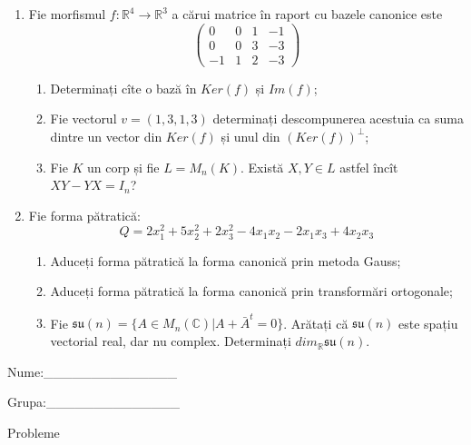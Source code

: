 \documentclass{article}
\begin{document}
\begin{enumerate}
 \item Fie morfismul $f:\mathbb{R}^4 \to \mathbb{R}^3$ a cărui matrice în raport cu bazele canonice este
$$\begin{pmatrix}
0&0&1&-1\\
0&0&3&-3\\
-1&1&2&-3
\end{pmatrix}$$

\begin{enumerate}
\item Determinați cîte o bază în $Ker(f)$ și $Im(f)$;
\item Fie vectorul $v=(1,3,1,3)$ determinați descompunerea acestuia ca suma dintre un vector din $Ker(f)$ și unul din $(Ker(f))^\perp$;
\item Fie $K$ un corp și fie $L=M_n(K)$. Există $X,Y \in L$ astfel încît $XY-YX=I_n$?  
\end{enumerate}
\item Fie forma pătratică:
$$Q= 2x_1^2+5x_2^2+2x_3^2-4x_1x_2-2x_1x_3+4x_2x_3$$

\begin{enumerate}
\item Aduceți forma pătratică la forma canonică prin metoda Gauss;
\item Aduceți forma pătratică la forma canonică prin transformări ortogonale;
\item Fie $\mathfrak{su}(n)=\{ A \in M_n(\mathbb{C}) | A+\bar{A}^t=0\}$. Arătați că $\mathfrak{su}(n)$ este spațiu vectorial real, dar nu complex.
Determinați $dim_{\mathbb{R}}\mathfrak{su}(n)$.
\end{enumerate}
\end{enumerate}
\newpage
\begin{flushright}
Nume:\_\_\_\_\_\_\_\_\_\_\_\_\_\_
 
 
Grupa:\_\_\_\_\_\_\_\_\_\_\_\_\_\_
\end{flushright}
\begin{center}
\vspace{2cm}
{\Large Probleme}
\vspace{2cm}
\end{center}
\end{document}
